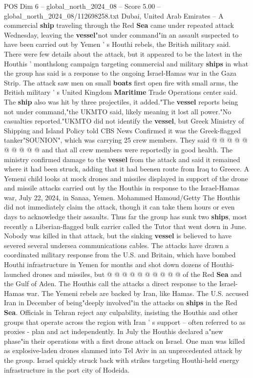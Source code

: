 \begin{textsample}{POS Dim 6 – global\_north\_2024\_08 – Score 5.00 – global\_north\_2024\_08/112698258.txt}  \label{ex:f6_pos_377}
Dubai, United Arab Emirates -- A commercial \textbf{ship} traveling through the Red \textbf{Sea} came under repeated attack Wednesday, leaving the \textbf{vessel}"not under command"in an assault suspected to have been carried out by Yemen ' s Houthi rebels, the British military said.
There were few details about the attack, but it appeared to be the latest in the Houthis ' monthslong campaign targeting commercial and military \textbf{ships} in what the group has said is a response to the ongoing Israel-Hamas war in the Gaza Strip.
The attack saw men on small \textbf{boats} first open fire with small arms, the British military ' s United Kingdom \textbf{Maritime} Trade Operations center said.
The \textbf{ship} also was hit by three projectiles, it added."The \textbf{vessel} reports being not under command,"the UKMTO said, likely meaning it lost all power."No casualties reported."UKMTO did not identify the \textbf{vessel}, but Greek Ministry of Shipping and Island Policy told CBS News Confirmed it was the Greek-flagged tanker"SOUNION", which was carrying 25 crew members.
They said @ @ @ @ @ @ @ @ @ @ and that all crew members were reportedly in good health.
The ministry confirmed damage to the \textbf{vessel} from the attack and said it remained where it had been struck, adding that it had beenen route from Iraq to Greece.
A Yemeni child looks at mock drones and missiles displayed in support of the drone and missile attacks carried out by the Houthis in response to the Israel-Hamas war, July 22, 2024, in Sanaa, Yemen.
Mohammed Hamoud/Getty The Houthis did not immediately claim the attack, though it can take them hours or even days to acknowledge their assaults.
Thus far the group has sunk two \textbf{ships}, most recently a Liberian-flagged bulk carrier called the Tutor that went down in June.
Nobody was killed in that attack, but the sinking \textbf{vessel} is believed to have severed several undersea communications cables.
The attacks have drawn a coordinated military response from the U.S. and Britain, which have bombed Houthi infrastructure in Yemen for months and shot down dozens of Houthi-launched drones and missiles, but @ @ @ @ @ @ @ @ @ @ of the Red \textbf{Sea} and the Gulf of Aden.
The Houthis call the attacks a direct response to the Israel-Hamas war.
The Yemeni rebels are backed by Iran, like Hamas.
The U.S. accused Iran in December of being"deeply involved"in the attacks on \textbf{ships} in the Red \textbf{Sea}.
Officials in Tehran reject any culpability, insisting the Houthis and other groups that operate across the region with Iran ' s support -- often referred to as proxies - plan and act independently.
In July the Houthis declared a"new phase"in their operations with a first drone attack on Israel.
One man was killed as explosive-laden drones slammed into Tel Aviv in an unprecedented attack by the group.
Israel quickly struck back with strikes targeting Houthi-held energy infrastructure in the port city of Hodeida.

\end{textsample}
